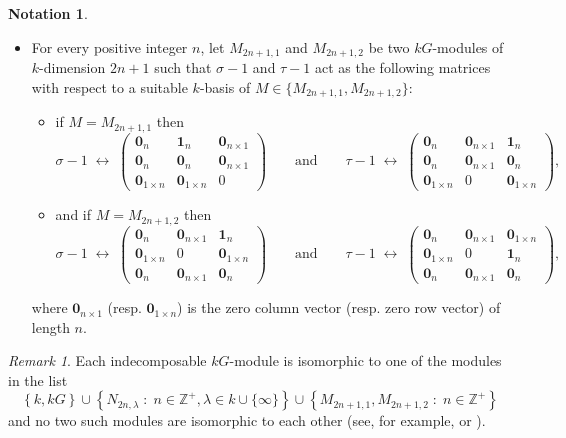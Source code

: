 \documentclass{amsart}
\numberwithin{equation}{section}
\numberwithin{table}{section}
\theoremstyle{plain}
\theoremstyle{definition}
\newtheorem{nota}[theorem]{Notation}
\theoremstyle{remark}
\newtheorem{remark}[theorem]{Remark}
\begin{document}
\begin{nota}
\begin{itemize}
\item[(c)] For every positive integer $n$, let $M_{2n+1,1}$ and $M_{2n+1,2}$ be two $kG$-modules of $k$-dimension $2n+1$ such that $\sigma-1$ and $\tau-1$ act as the following matrices with respect to a suitable $k$-basis of $M\in\{ M_{2n+1,1} , M_{2n+1,2}\}$:
\begin{itemize}
\item[$\bullet$] if $M=M_{2n+1,1}$ then
$$\sigma-1 \;\longleftrightarrow\; \left(\begin{array}{c|cc} \mathbf{0}_n&\mathbf{1}_n&\mathbf{0}_{n\times 1}\\ \hline \mathbf{0}_n&\mathbf{0}_n&\mathbf{0}_{n\times 1}\\ \mathbf{0}_{1\times n}&\mathbf{0}_{1\times n} & 0\end{array}\right)
\qquad\mbox{and}\qquad
\tau-1\;\longleftrightarrow\; \left(\begin{array}{c|cc} \mathbf{0}_n&\mathbf{0}_{n\times 1}&\mathbf{1}_n\\ \hline \mathbf{0}_n&\mathbf{0}_{n\times 1}&\mathbf{0}_n\\ \mathbf{0}_{1\times n} & 0&\mathbf{0}_{1\times n}\end{array}\right) ,$$
\item[$\bullet$] and if $M=M_{2n+1,2}$ then
$$\sigma-1 \;\longleftrightarrow\; \left(\begin{array}{cc|c} \mathbf{0}_n&\mathbf{0}_{n\times 1}&\mathbf{1}_n\\ \mathbf{0}_{1\times n}&0&\mathbf{0}_{1\times n}\\\hline \mathbf{0}_n&\mathbf{0}_{n\times 1}&\mathbf{0}_n\end{array}\right)
\qquad\mbox{and}\qquad
\tau-1\;\longleftrightarrow\; \left(\begin{array}{cc|c} \mathbf{0}_n&\mathbf{0}_{n\times 1}&\mathbf{0}_{1\times n}\\ \mathbf{0}_{1\times n}&0&\mathbf{1}_n\\\hline \mathbf{0}_n&\mathbf{0}_{n\times 1}&\mathbf{0}_n\end{array}\right) ,$$
\end{itemize}
where $\mathbf{0}_{n\times 1}$ (resp. $\mathbf{0}_{1\times n}$) is the zero column vector (resp. zero row vector) of length $n$.
\end{itemize}
\end{nota}

\begin{remark}
\label{rem:indecomposables}
Each indecomposable $kG$-module is isomorphic to one of the modules in the list
$$\left\{k,kG\right\} \cup
\left\{N_{2n,\lambda}\;:\;n \in\mathbb{Z}^+, \lambda\in k \cup\{\infty\}\right\} \cup 
\left\{M_{2n+1,1},M_{2n+1,2}\;:\;n \in\mathbb{Z}^+\right\}$$
and no two such modules are isomorphic to each other (see, for example, \cite{Basev1961} or \cite{Conlon1965}). 
\end{remark}
\end{document}
